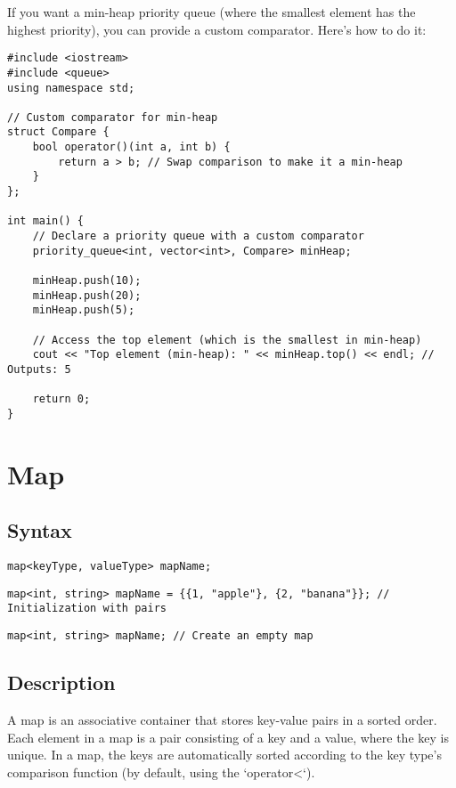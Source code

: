 \documentclass{article}
\begin{document}
If you want a min-heap priority queue (where the smallest element has the highest priority), you can provide a custom comparator. Here's how to do it:

\begin{lstlisting}
#include <iostream>
#include <queue>
using namespace std;

// Custom comparator for min-heap
struct Compare {
    bool operator()(int a, int b) {
        return a > b; // Swap comparison to make it a min-heap
    }
};

int main() {
    // Declare a priority queue with a custom comparator
    priority_queue<int, vector<int>, Compare> minHeap;
    
    minHeap.push(10);
    minHeap.push(20);
    minHeap.push(5);
    
    // Access the top element (which is the smallest in min-heap)
    cout << "Top element (min-heap): " << minHeap.top() << endl; // Outputs: 5
    
    return 0;
}
\end{lstlisting}

\section{Map}

\subsection{Syntax}

\begin{lstlisting}
map<keyType, valueType> mapName; 
\end{lstlisting}

\begin{lstlisting}
map<int, string> mapName = {{1, "apple"}, {2, "banana"}}; // Initialization with pairs
\end{lstlisting}

\begin{lstlisting}
map<int, string> mapName; // Create an empty map
\end{lstlisting}

\subsection{Description}

A map is an associative container that stores key-value pairs in a sorted order. Each element in a map is a pair consisting of a key and a value, where the key is unique. In a map, the keys are automatically sorted according to the key type's comparison function (by default, using the `operator<`).
\end{document}
